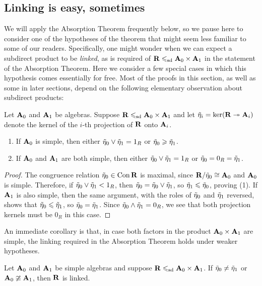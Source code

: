  \subsection{Linking is easy, sometimes}
  \label{sec:linking-lemmas}
  We will apply the Absorption Theorem frequently below, so we pause here to
  consider one of the hypotheses of the theorem that might seem less familiar to
  some of our readers.  Specifically, one might wonder when
   we can expect a subdirect product to be \emph{linked}, as is required 
  of $\mathbf{R} \leqslant_{\mathrm{sd}} \mathbf{A}_0\times \mathbf{A}_1$ in the statement of the Absorption Theorem.
  Here we consider a few special cases in which this hypothesis comes
  essentially for free.  Most of the proofs in this section, as well as some
  in later sections, depend on the following elementary observation about subdirect
  products:
  \begin{lemma}
    \label{lem:basic}
    Let $\mathbf{A}_0$ and $\mathbf{A}_1$ be algebras.  Suppose
    $\mathbf{R} \leqslant_{\mathrm{sd}} \mathbf{A}_0 \times \mathbf{A}_1$ and let $\tilde{\eta}_i = \ker(\mathbf{R} \twoheadrightarrow \mathbf{A}_i)$
    denote the kernel of the $i$-th projection of $\mathbf{R}$ onto $\mathbf{A}_i$. 
    \begin{enumerate}
    \item 
      If $\mathbf{A}_0$ is simple, then either $\tilde{\eta}_0 \vee \tilde{\eta}_1 = 1_R$ or $\tilde{\eta}_0 \geqslant \tilde{\eta}_1$.
    \item If $\mathbf{A}_0$ and $\mathbf{A}_1$ are both simple, then either $\tilde{\eta}_0 \vee \tilde{\eta}_1 = 1_R$
      or $\tilde{\eta}_0 = 0_R = \tilde{\eta}_1$.
    \end{enumerate}
  \end{lemma}
  \begin{proof}
    The congruence relation $\tilde{\eta}_0 \in \operatorname{Con} \mathbf{R}$ is maximal, since 
    $\mathbf{R}/\tilde{\eta}_0 \cong \mathbf{A}_0$ and $\mathbf{A}_0$ is simple. 
    Therefore, if $\tilde{\eta}_0 \vee \tilde{\eta}_1 < 1_R$, then $\tilde{\eta}_0 =\tilde{\eta}_0 \vee \tilde{\eta}_1$, so 
    $\tilde{\eta}_1 \leqslant \tilde{\eta}_0$, proving (1). If $\mathbf{A}_1$ is also simple, then the
    same argument, with the roles of $\tilde{\eta}_0$ and $\tilde{\eta}_1$ reversed, shows that
    $\tilde{\eta}_0 \leqslant \tilde{\eta}_1$, so   
    $\tilde{\eta}_0 = \tilde{\eta}_1$.  Since $\tilde{\eta}_0 \wedge  \tilde{\eta}_1 = 0_R$, we see that both 
    projection kernels must be $0_R$ in this case.
  \end{proof}
  An immediate corollary is that, in case both factors in the product
  $\mathbf{A}_0 \times \mathbf{A}_1$ are simple,
  the linking required in the Absorption Theorem holds under weaker hypotheses. 
  \begin{corollary}
    \label{cor:rect-two_factors-pre}
    Let $\mathbf{A}_0$ and $\mathbf{A}_1$ be simple algebras and suppose $\mathbf{R} \leqslant_{\mathrm{sd}} \mathbf{A}_0 \times \mathbf{A}_1$.
    If $\tilde{\eta}_0 \neq \tilde{\eta}_1$ or $\mathbf{A}_0 \ncong \mathbf{A}_1$, then $\mathbf{R}$ is linked.
  \end{corollary}

